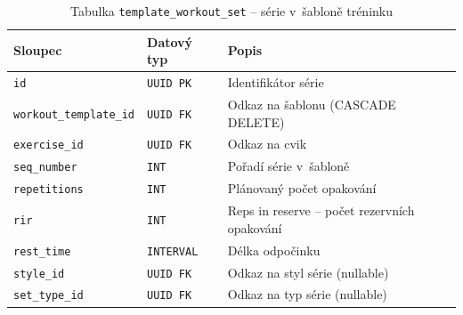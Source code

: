 \begin{table}[htbp]
    \centering
    \caption{Tabulka \texttt{template\_workout\_set} -- série v~šabloně tréninku}
    \label{tab:template-set}
    \begin{tabular}{|p{4.2cm}|p{3.2cm}|p{6.8cm}|}
        \hline
        \textbf{Sloupec}               & \textbf{Datový typ} & \textbf{Popis}                                \\
        \hline
        \texttt{id}                    & \texttt{UUID PK}    & Identifikátor série                           \\
        \hline
        \texttt{workout\_template\_id} & \texttt{UUID FK}    & Odkaz na šablonu (CASCADE DELETE)             \\
        \hline
        \texttt{exercise\_id}          & \texttt{UUID FK}    & Odkaz na cvik                                 \\
        \hline
        \texttt{seq\_number}           & \texttt{INT}        & Pořadí série v~šabloně                        \\
        \hline
        \texttt{repetitions}           & \texttt{INT}        & Plánovaný počet opakování                     \\
        \hline
        \texttt{rir}                   & \texttt{INT}        & Reps in reserve -- počet rezervních opakování \\
        \hline
        \texttt{rest\_time}            & \texttt{INTERVAL}   & Délka odpočinku                               \\
        \hline
        \texttt{style\_id}             & \texttt{UUID FK}    & Odkaz na styl série (nullable)                \\
        \hline
        \texttt{set\_type\_id}         & \texttt{UUID FK}    & Odkaz na typ série (nullable)                 \\
        \hline
    \end{tabular}
\end{table}